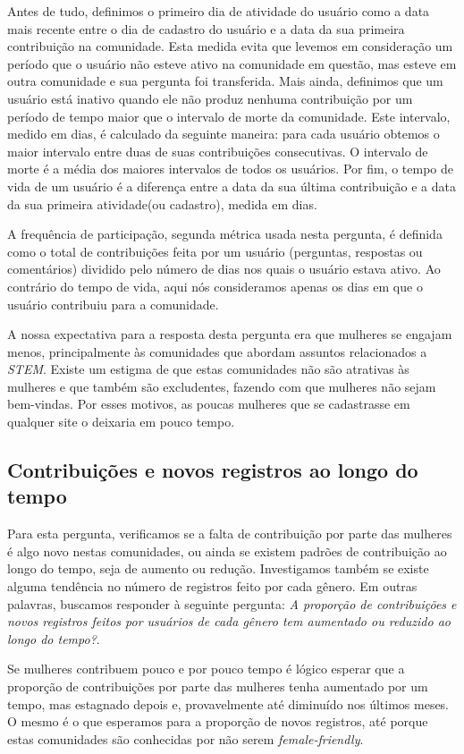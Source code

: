 Antes de tudo, definimos o primeiro dia de atividade do usuário como a data mais recente entre o dia de cadastro do usuário e a data da sua primeira contribuição na comunidade. Esta medida evita que levemos em consideração um período que o usuário não esteve ativo na comunidade em questão, mas esteve em outra comunidade e sua pergunta foi transferida. Mais ainda, definimos que um usuário está inativo quando ele não produz nenhuma contribuição por um período de tempo maior que o intervalo de morte da comunidade. Este intervalo, medido em dias, é calculado da seguinte maneira: para cada usuário obtemos o maior intervalo entre duas de suas contribuições consecutivas. O intervalo de morte é a média dos maiores intervalos de todos os usuários. Por fim, o tempo de vida de um usuário é a diferença entre a data da sua última contribuição e a data da sua primeira atividade(ou cadastro), medida em dias.

A frequência de participação, segunda métrica usada nesta pergunta, é definida como o total de contribuições feita por um usuário (perguntas, respostas ou comentários) dividido pelo número de dias nos quais o usuário estava ativo. Ao contrário do tempo de vida, aqui nós consideramos apenas os dias em que o usuário contribuiu para a comunidade.

A nossa expectativa para a resposta desta pergunta era que mulheres se engajam menos, principalmente às comunidades que abordam assuntos relacionados a \emph{STEM}. Existe um estigma de que estas comunidades não são atrativas às mulheres e que também são excludentes, fazendo com que mulheres não sejam bem-vindas. Por esses motivos, as poucas mulheres que se cadastrasse em qualquer site o deixaria em pouco tempo.

\subsection{Contribuições e novos registros ao longo do tempo}

Para esta pergunta, verificamos se a falta de contribuição por parte das mulheres é algo novo nestas comunidades, ou ainda se existem padrões de contribuição ao longo do tempo, seja de aumento ou redução. Investigamos também se existe alguma tendência no número de registros feito por cada gênero. Em outras palavras, buscamos responder à seguinte pergunta: \textit{A proporção de contribuições e novos registros feitos por usuários de cada gênero tem aumentado ou reduzido ao longo do tempo?}. 

Se mulheres contribuem pouco e por pouco tempo é lógico esperar que a proporção de contribuições por parte das mulheres tenha aumentado por um tempo, mas estagnado depois e, provavelmente até diminuído nos últimos meses. O mesmo é o que esperamos para a proporção de novos registros, até porque estas comunidades são conhecidas por não serem \emph{female-friendly}.

